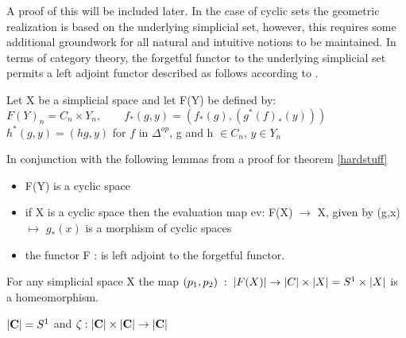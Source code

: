 \documentclass[../../main.tex]{subfiles}
\begin{document}
    A proof of this will be included later. In the case of cyclic sets the geometric realization is based on the underlying simplicial set, however, this requires some additional groundwork for all natural and intuitive notions to be maintained. In terms of category theory, the forgetful functor to the underlying simplicial set permits a left adjoint functor described as follows according to \cite{loday-cyclic}. 

    \begin{definition}
        Let X be a simplicial space and let F(Y) be defined by:
        $F(Y)_n=C_n\times Y_n, \qquad f_*(g,y)=(f_*(g), (g^*(f)_*(y)))$
        $h^*(g,y) = (hg,y) $ for $f$ in $\Delta^{op}$, g and h $\in C_n$, $y\in Y_n$
    \end{definition}

    In conjunction with the following lemmas from \cite{loday-cyclic} a proof for theorem \ref{hardstuff} 

    \begin{lemma}
        \begin{itemize}
            \item F(Y) is a cyclic space
            \item if X is a cyclic space then the evaluation map ev: F(X) $\to$ X, given by (g,x) $\mapsto$ $g_*(x)$ is a morphism of cyclic spaces
            \item the functor F : is left adjoint to the forgetful functor.
        \end{itemize}
    \end{lemma}

    \begin{lemma}
        For any simplicial space X the map $(p_1,p_2)\; : \;\geom[F(X)]\to \geom[C]\times \geom[X]= S^1\times \geom[X]$ is a homeomorphism. 
    \end{lemma}

    \begin{lemma}
        $\geom[\cat{C}]= S^1$ and $\zeta : \geom[\cat{C}]\times \geom[\cat{C}]\to \geom[\cat{C}]$
    \end{lemma}
\end{document}

